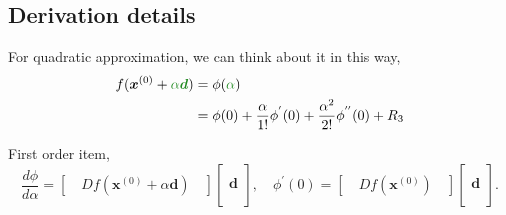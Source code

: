 \documentclass[12pt,thmsa]{article}
\begin{document}
\newpage
\subsection{Derivation details}

For quadratic approximation, we can think about it in this way,
\[\begin{aligned}
	f( \boldsymbol{x}^{(0)}+{\color{forestgreen}{\alpha} \boldsymbol{d}} ) &= \phi ({\color{forestgreen}{\alpha}}) \\
	&= \phi(0) + \frac{\alpha}{1!}\phi^{'}(0) + \frac{\alpha^{2}}{2!}\phi^{''}(0) + R_3 \end{aligned}
\]

	First order item,
	\[ \frac{d \phi}{d \alpha}=\left[ \quad D f\left( \boldsymbol{x}^{(0)} + \alpha \boldsymbol{d} \right) \quad \right] \left[
	\begin{array}{c} \\ \boldsymbol{d} \\ \\ \end{array}\right],
	\quad \phi^{'}(0)= \left[\quad D f\left(\boldsymbol{x}^{(0)} \right) \quad\right]\left[\begin{aligned} \\ \boldsymbol{d} \\  \\\end{aligned}\right]. \]
	
\end{document}
